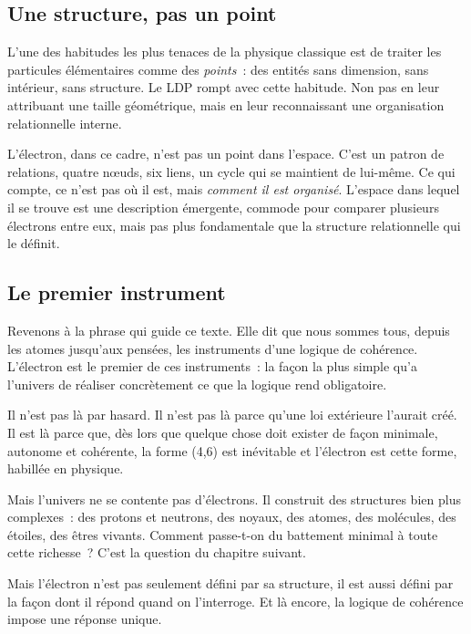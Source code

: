 \documentclass[12pt, a4paper, openright]{book}
\begin{document}
\subsection*{Une structure, pas un point}

L'une des habitudes les plus tenaces de la physique classique est de traiter les particules élémentaires comme des \emph{points}~: des entités sans dimension, sans intérieur, sans structure. Le LDP rompt avec cette habitude. Non pas en leur attribuant une taille géométrique, mais en leur reconnaissant une organisation relationnelle interne.

\medskip

L'électron, dans ce cadre, n'est pas un point dans l'espace. C'est un patron de relations, quatre n\oe{}uds, six liens, un cycle qui se maintient de lui-même. Ce qui compte, ce n'est pas où il est, mais \emph{comment il est organisé}. L'espace dans lequel il se trouve est une description émergente, commode pour comparer plusieurs électrons entre eux, mais pas plus fondamentale que la structure relationnelle qui le définit.

\subsection*{Le premier instrument}

Revenons à la phrase qui guide ce texte. Elle dit que nous sommes tous, depuis les atomes jusqu'aux pensées, les instruments d'une logique de cohérence. L'électron est le premier de ces instruments~: la façon la plus simple qu'a l'univers de réaliser concrètement ce que la logique rend obligatoire.

\medskip

Il n'est pas là par hasard. Il n'est pas là parce qu'une loi extérieure l'aurait créé. Il est là parce que, dès lors que quelque chose doit exister de façon minimale, autonome et cohérente, la forme (4,6) est inévitable et l'électron est cette forme, habillée en physique.

\medskip

Mais l'univers ne se contente pas d'électrons. Il construit des structures bien plus complexes~: des protons et neutrons, des noyaux, des atomes, des molécules, des étoiles, des êtres vivants. Comment passe-t-on du battement minimal à toute cette richesse~? C'est la question du chapitre suivant.

\medskip

Mais l'électron n'est pas seulement défini par sa structure, il est aussi défini par la façon dont il répond quand on l'interroge. Et là encore, la logique de cohérence impose une réponse unique.
\end{document}
